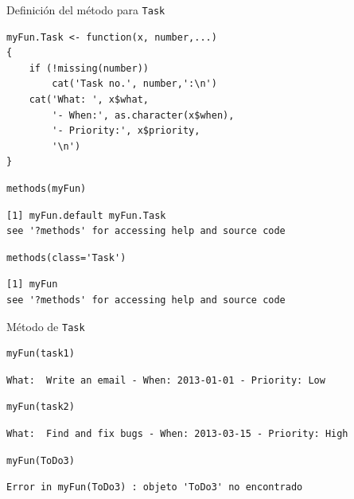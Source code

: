 \documentclass[xcolor={usenames,svgnames,dvipsnames}]{beamer}
\begin{document}
\begin{frame}[label={sec:org316b620},fragile]{Definición del método para \texttt{Task}}
 \lstset{language=r,label= ,caption= ,captionpos=b,numbers=none}
\begin{lstlisting}
myFun.Task <- function(x, number,...)
{
    if (!missing(number))
        cat('Task no.', number,':\n')
    cat('What: ', x$what,
        '- When:', as.character(x$when),
        '- Priority:', x$priority,
        '\n')
}
\end{lstlisting}

\lstset{language=r,label= ,caption= ,captionpos=b,numbers=none}
\begin{lstlisting}
methods(myFun)
\end{lstlisting}

\begin{verbatim}
[1] myFun.default myFun.Task   
see '?methods' for accessing help and source code
\end{verbatim}


\lstset{language=r,label= ,caption= ,captionpos=b,numbers=none}
\begin{lstlisting}
methods(class='Task')
\end{lstlisting}

\begin{verbatim}
[1] myFun
see '?methods' for accessing help and source code
\end{verbatim}
\end{frame}

\begin{frame}[label={sec:org9d6d18d},fragile]{Método de \texttt{Task}}
 \lstset{language=r,label= ,caption= ,captionpos=b,numbers=none}
\begin{lstlisting}
myFun(task1)
\end{lstlisting}

\begin{verbatim}
What:  Write an email - When: 2013-01-01 - Priority: Low
\end{verbatim}


\lstset{language=r,label= ,caption= ,captionpos=b,numbers=none}
\begin{lstlisting}
myFun(task2)
\end{lstlisting}

\begin{verbatim}
What:  Find and fix bugs - When: 2013-03-15 - Priority: High
\end{verbatim}


\lstset{language=r,label= ,caption= ,captionpos=b,numbers=none}
\begin{lstlisting}
myFun(ToDo3)
\end{lstlisting}

\begin{verbatim}
Error in myFun(ToDo3) : objeto 'ToDo3' no encontrado
\end{verbatim}
\end{frame}
\end{document}
